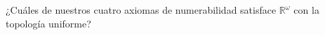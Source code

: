 
   \item ¿Cuáles de nuestros cuatro axiomas de numerabilidad satisface $\mathbb{R}^{\omega}$ con la topología uniforme?

